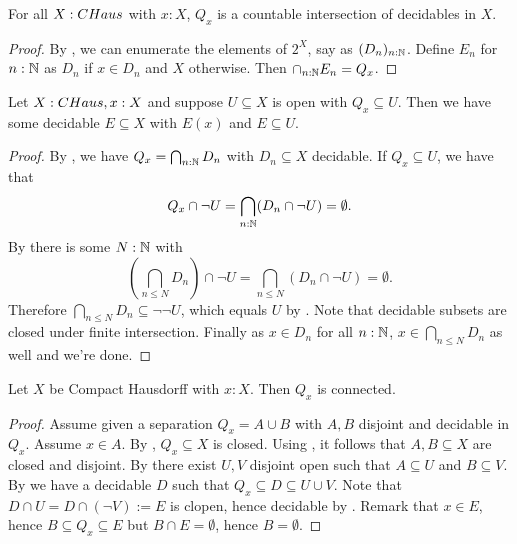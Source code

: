\begin{lemma}\label{ConnectedComponentClosedInCompactHausdorff}
For all $X:\CHaus$ with $x:X$, $Q_x$ is a countable intersection of decidables in $X$.
\end{lemma}
\begin{proof}
  By ,
  we can enumerate the elements of $2^X$, say as $(D_n)_{n:\mathbb{N}}$. 
  Define $E_n$ for $n:\mathbb{N}$ as $D_n$ if $x\in D_n$ and $X$ otherwise. 
  Then $\cap_{n:\mathbb{N}}E_n = Q_x$.
\end{proof}
%

\begin{lemma}\label{ConnectedComponentSubOpenHasDecidableInbetween}
  Let $X:\Chaus, x:X$ and suppose $U\subseteq X$ is open with $Q_x\subseteq U$. 
  Then we have some decidable $E\subseteq X$ with $E(x)$ and $E\subseteq U$. 
\end{lemma}
\begin{proof}
  By , 
  we have $Q_x = \bigcap_{n:\mathbb{N}}D_n$ with $D_n\subseteq X$ decidable. 
  If $Q_x \subseteq U$, we have that 
  $$Q_x\cap \neg U = \bigcap_{n:\mathbb{N}} (D_n \cap \neg U) = \emptyset.$$
  By  there is some $N:\mathbb{N}$ with 
  $$(\bigcap_{n\leq N} D_n )\cap \neg U  = \bigcap_{n\leq N} (D_n \cap \neg U) = \emptyset.$$
  Therefore $\bigcap_{n\leq N} D_n \subseteq \neg\neg U$, which equals $U$ by .
  Note that decidable subsets are closed under finite intersection. 
  Finally as $x\in D_n$ for all $n:\mathbb{N}$, $x\in \bigcap_{n\leq N} D_n$ as well and we're done. 
\end{proof}
\begin{lemma}\label{ConnectedComponentConnected}
Let $X$ be Compact Hausdorff with $x:X$. Then $Q_x$ is connected.
\end{lemma}
\begin{proof}
Assume given a separation $Q_x = A\cup B$ with $A,B$ disjoint and decidable in $Q_x$. Assume $x\in A$. 
%
By , $Q_x\subseteq X$ is closed. 
Using , it follows that $A,B\subseteq X$ are closed and disjoint.
By  there exist $U,V$ disjoint open such that $A\subseteq U$ and $B\subseteq V$. 
%
By  we have a decidable $D$ such that $Q_x\subseteq D\subseteq U\cup V$. 
Note that $D\cap U = D \cap (\neg V):=E$ is clopen, hence decidable by .
Remark that $x\in E$, hence $B\subseteq Q_x \subseteq E$ but $B \cap E = \emptyset$, hence $B=\emptyset$. 
%
\end{proof}

